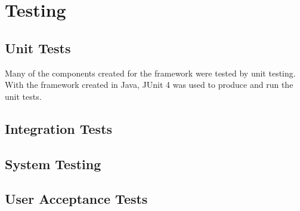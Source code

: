\chapter{Testing}
\section{Unit Tests}
Many of the components created for the framework were tested by unit testing.
With the framework created in Java, JUnit 4\cite{junitweb} was used to produce and run the unit tests.
\section{Integration Tests}
\section{System Testing}
\section{User Acceptance Tests}

